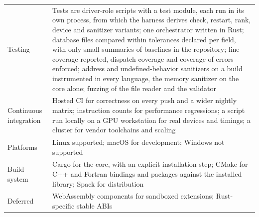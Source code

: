 \documentclass[11pt,a4paper]{article}
\begin{document}
{\begin{xltabular}{\textwidth}{@{}>{\raggedright\arraybackslash}p{32mm} L@{}}
Testing & Tests are driver-role scripts with a test module, each run in its own process, from which the harness derives check, restart, rank, device and sanitizer variants; one orchestrator written in Rust; database files compared within tolerances declared per field, with only small summaries of baselines in the repository; line coverage reported, dispatch coverage and coverage of errors enforced; address and undefined-behavior sanitizers on a build instrumented in every language, the memory sanitizer on the core alone; fuzzing of the file reader and the validator \\
Continuous integration & Hosted CI for correctness on every push and a wider nightly matrix; instruction counts for performance regressions; a script run locally on a GPU workstation for real devices and timings; a cluster for vendor toolchains and scaling \\
Platforms & Linux supported; macOS for development; Windows not supported \\
Build system & Cargo for the core, with an explicit installation step; CMake for C++ and Fortran bindings and packages against the installed library; Spack for distribution \\
Deferred & WebAssembly components for sandboxed extensions; Rust-specific stable ABIs \\
\end{xltabular}
}

\printbibliography
\end{document}
